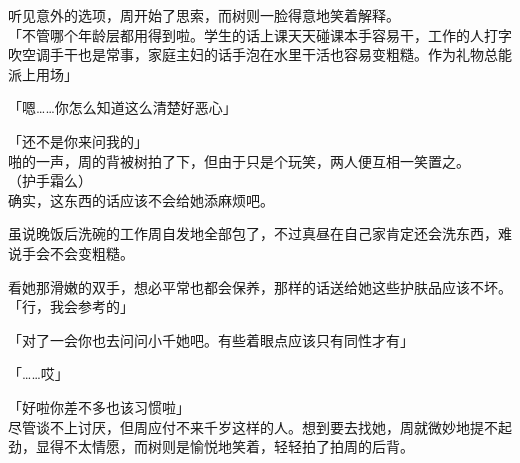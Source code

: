 听见意外的选项，周开始了思索，而树则一脸得意地笑着解释。\\

「不管哪个年龄层都用得到啦。学生的话上课天天碰课本手容易干，工作的人打字吹空调手干也是常事，家庭主妇的话手泡在水里干活也容易变粗糙。作为礼物总能派上用场」

「嗯……你怎么知道这么清楚好恶心」

「还不是你来问我的」\\

啪的一声，周的背被树拍了下，但由于只是个玩笑，两人便互相一笑置之。\\

（护手霜么）\\

确实，这东西的话应该不会给她添麻烦吧。

虽说晚饭后洗碗的工作周自发地全部包了，不过真昼在自己家肯定还会洗东西，难说手会不会变粗糙。

看她那滑嫩的双手，想必平常也都会保养，那样的话送给她这些护肤品应该不坏。\\

「行，我会参考的」

「对了一会你也去问问小千她吧。有些着眼点应该只有同性才有」

「……哎」

「好啦你差不多也该习惯啦」\\

尽管谈不上讨厌，但周应付不来千岁这样的人。想到要去找她，周就微妙地提不起劲，显得不太情愿，而树则是愉悦地笑着，轻轻拍了拍周的后背。
